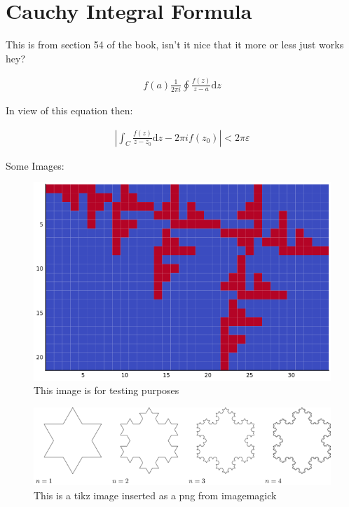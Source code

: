 \documentclass[11pt]{article}
\author{Ryan Greenup}
\date{\today}
\title{}
\begin{document}
\tableofcontents


\section{Cauchy Integral Formula}
\label{cauchy-integral-formula}
This is from section 54 of the book, isn't it nice that it more or less
just works hey? \cite{zhangMakingEigenvectorBasedReputation2004}

\begin{align}
f\left( a \right) \frac{1}{2\pi i} \oint \frac{f\left( z \right)}{z- a}\mathrm{d}z
\end{align}

In view of this equation then: \cite{zhangMakingEigenvectorBasedReputation2004}

$$\begin{aligned}
\left| \int_C \frac{f\left( z \right)}{z- z_0} \mathrm{d}z - 2 \pi i f\left( z_0 \right) \right|<2 \pi \varepsilon
\end{aligned}$$

Some Images: \cite{ngStableAlgorithmsLink2001}

\begin{figure}[htbp]
\centering
\includegraphics[width=12cm]{media/my-self-rep-frac.png}
\caption{\label{testim}This image is for testing purposes \cite{moskowitzLibraryGuidesWikipedia}}
\end{figure}

\begin{figure}[htbp]
\centering
\includegraphics[width=12cm]{media/tikz/Snowflake.png}
\caption{\label{testtikzins}This is a tikz image inserted as a png from imagemagick}
\end{figure}
\end{document}

